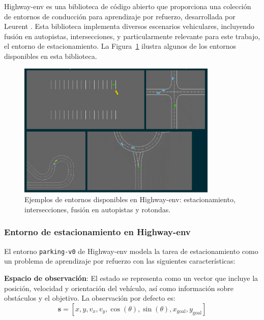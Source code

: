 \noindent
Highway-env es una biblioteca de código abierto que proporciona una colección de entornos
de conducción para aprendizaje por refuerzo, desarrollada por Leurent \cite{highway-env}.
Esta biblioteca implementa diversos escenarios vehiculares, incluyendo fusión en autopistas,
intersecciones, y particularmente relevante para este trabajo, el entorno de estacionamiento.
La Figura~\ref{fig:highway-env-scenarios} ilustra algunos de los entornos disponibles en esta biblioteca.

\begin{figure}[!ht]
    \centering
    \includegraphics[width=0.85\textwidth]{img/2-mt/higthway-env.png}
    \caption{Ejemplos de entornos disponibles en Highway-env: estacionamiento, intersecciones, fusión en autopistas y rotondas.}
    \label{fig:highway-env-scenarios}
\end{figure}

\subsubsection{Entorno de estacionamiento en Highway-env}\label{subsec:highway-env-theory}
\noindent
El entorno \texttt{parking-v0} de Highway-env modela la tarea de estacionamiento como un
problema de aprendizaje por refuerzo con las siguientes características:

\noindent
\textbf{Espacio de observación}: El estado se representa como un vector que incluye
la posición, velocidad y orientación del vehículo, así como información sobre
obstáculos y el objetivo. La observación por defecto es:
\begin{equation}
    \mathbf{s} = [x, y, v_x, v_y, \cos(\theta), \sin(\theta), x_{\text{goal}}, y_{\text{goal}}]
\end{equation}

